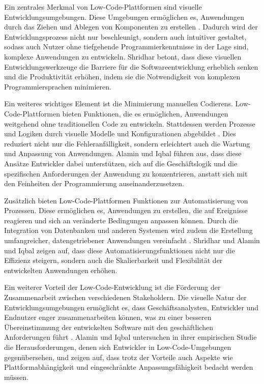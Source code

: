Ein zentrales Merkmal von Low-Code-Plattformen sind visuelle Entwicklungsumgebungen. Diese Umgebungen ermöglichen 
es, Anwendungen durch das Ziehen und Ablegen von Komponenten zu erstellen \cite{Bock_2021}. Dadurch wird 
der Entwicklungsprozess nicht nur beschleunigt, sondern auch intuitiver gestaltet, sodass auch Nutzer ohne 
tiefgehende Programmierkenntnisse in der Lage sind, komplexe Anwendungen zu entwickeln. Shridhar \cite{Shridhar_2021} betont, 
dass diese visuellen Entwicklungswerkzeuge die Barriere für die Softwareentwicklung erheblich senken und die 
Produktivität erhöhen, indem sie die Notwendigkeit von komplexen Programmiersprachen minimieren.

Ein weiteres wichtiges Element ist die Minimierung manuellen Codierens. Low-Code-Plattformen bieten Funktionen, 
die es ermöglichen, Anwendungen weitgehend ohne traditionellen Code zu entwickeln. Stattdessen werden Prozesse 
und Logiken durch visuelle Modelle und Konfigurationen abgebildet \cite{Bock_2021}. Dies reduziert nicht nur 
die Fehleranfälligkeit, sondern erleichtert auch die Wartung und Anpassung von Anwendungen. Alamin und Iqbal \cite{Alamin_2021} 
führen aus, dass diese Ansätze Entwickler dabei unterstützen, sich auf die Geschäftslogik und die spezifischen Anforderungen 
der Anwendung zu konzentrieren, anstatt sich mit den Feinheiten der Programmierung auseinanderzusetzen.

Zusätzlich bieten Low-Code-Plattformen Funktionen zur Automatisierung von Prozessen. Diese ermöglichen es, Anwendungen 
zu erstellen, die auf Ereignisse reagieren und sich an veränderte Bedingungen anpassen können. Durch die Integration 
von Datenbanken und anderen Systemen wird zudem die Erstellung umfangreicher, datengetriebener Anwendungen 
vereinfacht \cite{Bock_2021}. Shridhar \cite{Shridhar_2021} und Alamin und Iqbal \cite{Alamin_2021} zeigen auf, dass diese 
Automatisierungsfunktionen nicht nur die Effizienz steigern, sondern auch die Skalierbarkeit und Flexibilität 
der entwickelten Anwendungen erhöhen.

Ein weiterer Vorteil der Low-Code-Entwicklung ist die Förderung der Zusammenarbeit zwischen verschiedenen 
Stakeholdern. Die visuelle Natur der Entwicklungsumgebungen ermöglicht es, dass Geschäftsanalysten, Entwickler 
und Endnutzer enger zusammenarbeiten können, was zu einer besseren Übereinstimmung der entwickelten Software mit 
den geschäftlichen Anforderungen führt \cite{Shridhar_2021}. Alamin und Iqbal \cite{Alamin_2021} untersuchen in ihrer empirischen 
Studie die Herausforderungen, denen sich Entwickler in Low-Code-Umgebungen gegenübersehen, und zeigen auf, dass trotz 
der Vorteile auch Aspekte wie Plattformabhängigkeit und eingeschränkte Anpassungsfähigkeit bedacht werden müssen.


